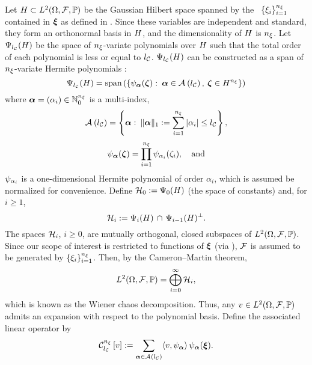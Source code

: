 Let $H \subset L^{2}(\Omega, \mathcal{F}, \mathbb{P})$ be the Gaussian Hilbert space \cite{janson1997} spanned by the \rvs\ $\{ \xi_i \}_{i = 1}^{n_\xi}$ contained in $\bm{\xi}$ as defined in .
Since these variables are independent and standard, they form an orthonormal basis in $H$, and the dimensionality of $H$ is ${n_\xi}$.
Let $\Psi_{l_\mathcal{C}}(H)$ be the space of ${n_\xi}$-variate polynomials over $H$ such that the total order of each polynomial is less or equal to ${l_\mathcal{C}}$.
$\Psi_{l_\mathcal{C}}(H)$ can be constructed as a span of ${n_\xi}$-variate Hermite polynomials \cite{maitre2010, eldred2008}:
\[
  \Psi_{l_\mathcal{C}}(H) = \text{span}\left( \left\{ \psi_{\bm{\alpha}}(\bm{\zeta}): \: \bm{\alpha} \in \mathcal{A}_{}\left( {l_\mathcal{C}} \right), \: \bm{\zeta} \in H^{n_\xi} \right\} \right)
\]
where $\bm{\alpha} = (\alpha_i) \in \mathbb{N}_{0}^{n_\xi}$ is a multi-index,
\begin{equation} \xelab{isotropic-total-order-index-set}
  \chaosMultiindexSet{\nclevel} = \left\{ \multiindex: \: \norm[1]{\multiindex} := \sum_{i = 1}^\nvars |\alpha_i| \leq \nclevel \right\},
\end{equation}
\[
  \psi_{\bm{\alpha}}(\bm{\zeta}) = \prod_{i = 1}^{n_\xi} \psi_{\alpha_i}(\zeta_i), \hspace{1em} \text{and}
\]
$\psi_{\alpha_i}$ is a one-dimensional Hermite polynomial of order $\alpha_i$, which is assumed be normalized for convenience.
Define $\mathcal{H}_0 := \Psi_0(H)$ (the space of constants) and, for $i \geq 1$,
\[
  \mathcal{H}_i := \Psi_i(H) \, \cap \, \Psi_{i - 1}(H)^\perp.
\]
The spaces $\mathcal{H}_i$, $i \geq 0$, are mutually orthogonal, closed subspaces of $L^{2}(\Omega, \mathcal{F}, \mathbb{P})$.
Since our scope of interest is restricted to functions of $\bm{\xi}$ (via ), $\mathcal{F}$ is assumed to be generated by $\{ \xi_i \}_{i = 1}^{n_\xi}$.
Then, by the Cameron--Martin theorem,
\[
  L^{2}(\Omega, \mathcal{F}, \mathbb{P}) = \bigoplus_{i = 0}^\infty \mathcal{H}_i,
\]
which is known as the Wiener chaos decomposition.
Thus, any $v \in L^{2}(\Omega, \mathcal{F}, \mathbb{P})$ admits an expansion with respect to the polynomial basis.
Define the associated linear operator by
\begin{equation} \xelab{spectral-decomposition}
  \chaos{\nvars}{\nclevel}{\w} := \sum_{\multiindex \in \chaosMultiindexSet{\nclevel}} \innerProduct{\w, \polynomial_{\multiindex}} \, \polynomial_{\multiindex}(\vz).
\end{equation}
